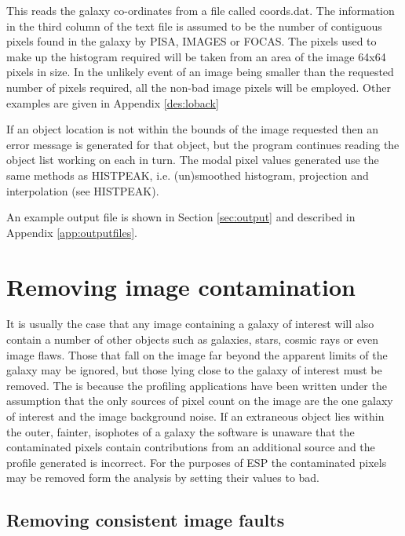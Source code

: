 \documentclass[twoside,11pt]{article}
\newcommand{\xref}[3]{#1}
\begin{document}
This reads the galaxy co-ordinates from a file called coords.dat. The 
information in the third column of the text file is assumed to be the 
number of contiguous pixels found in the galaxy by \xref{PISA}{sun109}{}, 
IMAGES or FOCAS. The 
pixels used to make up the histogram required will be taken from an 
area of the image 64x64 pixels in size. In the unlikely event
of an image being smaller than the requested number of pixels required,
all the non-bad image pixels will be employed. Other examples are given in
Appendix \ref{des:loback}

If an object location 
is not within the bounds of the image requested then an
error message is generated for that object, but the program continues
reading the object list working on each in turn. The modal pixel values
generated use the same methods as HISTPEAK, i.e. (un)smoothed histogram,
projection and interpolation (see HISTPEAK).

An example output file is shown in Section \ref{sec:output}
and described in Appendix \ref{app:outputfiles}.


\section{Removing image contamination}
\label{sec:removi}

It is usually the case that any image containing a galaxy of interest will
also contain a number of other objects such as galaxies, stars, cosmic rays 
or even image flaws.
Those that fall on the image far beyond the apparent limits of the 
galaxy may be ignored, but those lying close 
to the galaxy of interest must be
removed. The is because the profiling applications have been
written under the assumption that the only sources of pixel count
on the image are the one galaxy of interest and the image background noise.
If an extraneous object lies within the outer, fainter, isophotes of a galaxy
the software is unaware that the contaminated pixels contain 
contributions from an additional source and the profile generated is incorrect.
For the purposes of ESP the contaminated pixels may be removed form the
analysis by setting their values to bad.  

\subsection{Removing consistent image faults}
\end{document}
